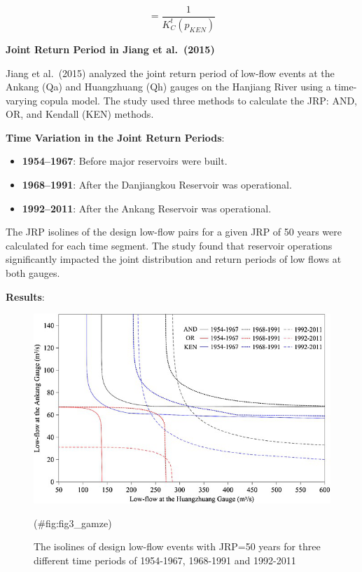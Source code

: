 \documentclass[
]{krantz}
\providecommand{\tightlist}{%
  \setlength{\itemsep}{0pt}\setlength{\parskip}{0pt}}
\begin{document}
\[
=\frac{1}{K_{C}^{t}\left(p_{K E N}\right)}
\]

\textbf{Joint Return Period in Jiang et al.~(2015)}

Jiang et al.~(2015) analyzed the joint return period of low-flow events at the Ankang (Qa) and Huangzhuang (Qh) gauges on the Hanjiang River using a time-varying copula model. The study used three methods to calculate the JRP: AND, OR, and Kendall (KEN) methods.

\textbf{Time Variation in the Joint Return Periods}:

\begin{itemize}
\tightlist
\item
  \textbf{1954--1967}: Before major reservoirs were built.
\item
  \textbf{1968--1991}: After the Danjiangkou Reservoir was operational.
\item
  \textbf{1992--2011}: After the Ankang Reservoir was operational.
\end{itemize}

The JRP isolines of the design low-flow pairs for a given JRP of 50 years were calculated for each time segment. The study found that reservoir operations significantly impacted the joint distribution and return periods of low flows at both gauges.

\textbf{Results}:

\begin{figure}

{\centering \includegraphics[width=0.8\linewidth]{./work/06-lowflow/figures/Figure_3} 

}

\caption{The isolines of design low-flow events with JRP=50 years for three different time periods of 1954-1967, 1968-1991 and 1992-2011}(\#fig:fig3\_gamze)
\end{figure}
\end{document}
